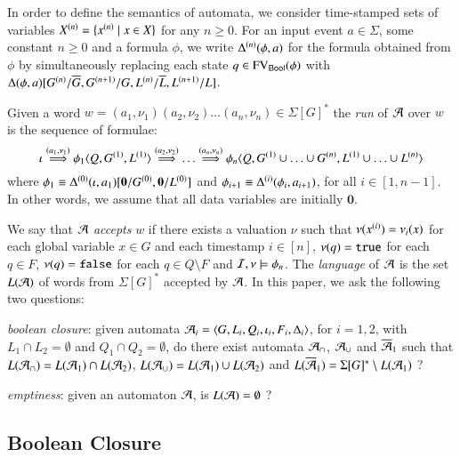 \documentclass{llncs}
\begin{document}
In order to define the semantics of automata, we consider time-stamped
sets of variables ${X}^{({n})} = \{{x}^{({n})} \mid x \in X\}$ for
any $n\geq0$. For an input event $a \in \Sigma$, some constant
$n\geq0$ and a formula $\phi$, we write ${\Delta}^{({n})}(\phi,a)$
for the formula obtained from $\phi$ by simultaneously replacing each
state $q \in \mathrm{FV}_{\mathsf{Bool}}(\phi)$ with
$\Delta(\phi,a)[{G}^{({n})}/\overline{G}, {G}^{({n+1})}/G,
  {L}^{({n})}/\overline{L}, {L}^{({n+1})}/L]$.

Given a word $w = (a_1,\nu_1)(a_2,\nu_2) \ldots (a_n,\nu_n) \in
\Sigma[G]^*$ the \emph{run} of $\mathcal{A}$ over $w$ is the sequence of
formulae: \[\iota \stackrel{(a_1,\nu_1)}{\Longrightarrow} \phi_1
\langle Q,{G}^{({1})}, {L}^{({1})} \rangle
\stackrel{(a_2,\nu_2)}{\Longrightarrow} \ldots
\stackrel{(a_n,\nu_n)}{\Longrightarrow} \phi_n\langle Q,{G}^{({1})}
  \cup \ldots \cup {G}^{({n})}, {L}^{({1})} \cup \ldots \cup
  {L}^{({n})} \rangle\] where $\phi_1 \equiv
{\Delta}^{({0})}(\iota,a_1)[\mathbf{0}/{G}^{({0})},\mathbf{0}/{L}^{({0})}]$
and $\phi_{i+1} \equiv {\Delta}^{({i})}(\phi_i,a_{i+1})$, for all $i
\in [1,n-1]$. In other words, we assume that all data variables are
initially $\mathbf{0}$.

We say that $\mathcal{A}$ \emph{accepts} $w$ if there exists a valuation $\nu$
such that $\nu({x}^{({i})}) = \nu_i(x)$ for each global variable $x
\in G$ and each timestamp $i \in [n]$, $\nu(q) = \mathtt{true}$ for each $q
\in F$, $\nu(q) = \mathtt{false}$ for each $q \in Q \setminus F$ and $\mathcal{I},\nu
\models \phi_n$. The \emph{language} of $\mathcal{A}$ is the set $L(\mathcal{A})$ of
words from $\Sigma[G]^*$ accepted by $\mathcal{A}$. In this paper, we ask the
following two questions: \begin{compactenum}
\item \emph{boolean closure}: given automata $\mathcal{A}_i =
  \langle G,L_i,Q_i,\iota_i,F_i,\Delta_i \rangle$, for $i=1,2$, with $L_1 \cap
  L_2 = \emptyset$ and $Q_1 \cap Q_2 = \emptyset$, do there exist
  automata $\mathcal{A}_\cap$, $\mathcal{A}_\cup$ and $\overline{\mathcal{A}}_1$ such that
  $L(\mathcal{A}_\cap) = L(\mathcal{A}_1) \cap L(\mathcal{A}_2)$, $L(\mathcal{A}_\cup) = L(\mathcal{A}_1) \cup
  L(\mathcal{A}_2)$ and $L(\overline{\mathcal{A}}_1) = \Sigma[G]^* \setminus L(\mathcal{A}_1)$ ?
%
\item \emph{emptiness}: given an automaton $\mathcal{A}$, is $L(\mathcal{A}) =
  \emptyset$ ?
\end{compactenum}

\subsection{Boolean Closure} 
\end{document}
